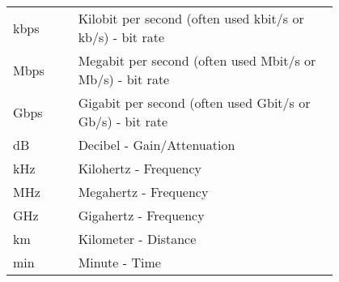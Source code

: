 \begin{flushleft}

\begin{tabular}{l p{0.8\linewidth}}


kbps     & Kilobit per second (often used kbit/s or kb/s) - bit rate\\
Mbps     & Megabit per second (often used Mbit/s or Mb/s) - bit rate\\
Gbps     & Gigabit per second (often used Gbit/s or Gb/s) - bit rate\\
dB       & Decibel - Gain/Attenuation\\
kHz      & Kilohertz - Frequency\\
MHz      & Megahertz - Frequency\\
GHz      & Gigahertz - Frequency\\
km       & Kilometer - Distance\\
min      & Minute - Time\\


\end{tabular}
\end{flushleft}